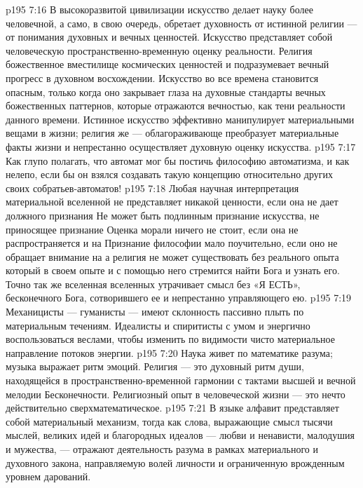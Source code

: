 \vs p195 7:16 В высокоразвитой цивилизации искусство делает науку более человечной, а само, в свою очередь, обретает духовность от истинной религии --- от понимания духовных и вечных ценностей. Искусство представляет собой человеческую пространственно\hyp{}временную оценку реальности. Религия  божественное вместилище космических ценностей и подразумевает вечный прогресс в духовном восхождении. Искусство во все времена становится опасным, только когда оно закрывает глаза на духовные стандарты вечных божественных паттернов, которые отражаются вечностью, как тени реальности данного времени. Истинное искусство эффективно манипулирует материальными вещами в жизни; религия же --- облагораживающе преобразует материальные факты жизни и непрестанно осуществляет духовную оценку искусства.
\vs p195 7:17 \pc Как глупо полагать, что автомат мог бы постичь философию автоматизма, и как нелепо, если бы он взялся создавать такую концепцию относительно других своих собратьев\hyp{}автоматов!
\vs p195 7:18 \pc Любая научная интерпретация материальной вселенной не представляет никакой ценности, если она не дает должного признания  Не может быть подлинным признание искусства, не приносящее признание  Оценка морали ничего не стоит, если она не распространяется и на  Признание философии мало поучительно, если оно не обращает внимание на  а религия не может существовать без реального опыта  который в своем опыте и с помощью него стремится найти Бога и узнать его. Точно так же вселенная вселенных утрачивает смысл без «Я ЕСТЬ», бесконечного Бога, сотворившего ее и непрестанно управляющего ею.
\vs p195 7:19 \pc Механицисты --- гуманисты --- имеют склонность пассивно плыть по материальным течениям. Идеалисты и спиритисты  с умом и энергично воспользоваться веслами, чтобы изменить по видимости чисто материальное направление потоков энергии.
\vs p195 7:20 \pc Наука живет по математике разума; музыка выражает ритм эмоций. Религия --- это духовный ритм души, находящейся в пространственно\hyp{}временной гармонии с тактами высшей и вечной мелодии Бесконечности. Религиозный опыт в человеческой жизни --- это нечто действительно сверхматематическое.
\vs p195 7:21 В языке алфавит представляет собой материальный механизм, тогда как слова, выражающие смысл тысячи мыслей, великих идей и благородных идеалов --- любви и ненависти, малодушия и мужества, --- отражают деятельность разума в рамках материального и духовного закона, направляемую волей личности и ограниченную врожденным уровнем дарований.
